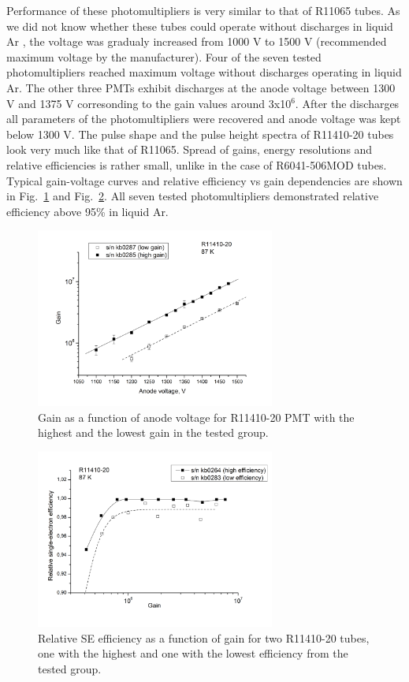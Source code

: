 \documentclass[a4paper,11pt]{article}
\begin{document}
Performance of these photomultipliers is very similar to that of R11065 tubes. As we did not know whether these tubes could operate without discharges in liquid Ar
, the voltage was gradualy increased from 1000 V to 1500 V (recommended maximum voltage by the manufacturer). Four of the seven tested photomultipliers reached maximum
voltage without discharges operating in liquid Ar. The other three PMTs exhibit discharges at the anode voltage between 1300 V and 1375 V corresonding to the gain values around
3x10$^6$. After the discharges all parameters of the photomultipliers were recovered and anode voltage was kept below 1300 V. The pulse shape and the pulse height 
spectra of R11410-20 tubes look very much like that of R11065. Spread of gains, energy resolutions and relative efficiencies is rather small, 
unlike in the case of R6041-506MOD tubes. Typical gain-voltage curves and relative efficiency vs gain dependencies are shown 
in Fig.~\ref{fig:R11410gain} and Fig.~\ref{fig:R11410eff}. All seven tested photomultipliers demonstrated relative efficiency 
above 95\% in liquid Ar. 
\begin{figure}[htbp]
\centering
\includegraphics[width=0.7\textwidth,viewport=1 1 700 550,clip]{figures/R11410gain.png}
\caption{Gain as a function of anode voltage for R11410-20 PMT with the highest and the lowest gain in the tested group.}
\label{fig:R11410gain}
\end{figure}
\begin{figure}[htbp]
\centering
\includegraphics[width=0.7\textwidth,viewport=1 50 700 500,clip]{figures/R11410eff.png}
\caption{Relative SE efficiency as a function of gain for two R11410-20 tubes, one with the highest 
and one with the lowest efficiency from the tested group.}
\label{fig:R11410eff}
\end{figure}
\end{document}
